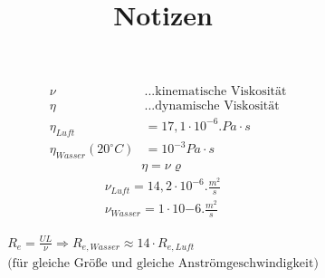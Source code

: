 \documentclass[10pt]{article}
\title{Notizen}
\begin{document}
\maketitle


\begin{align*}
&\nu  \qquad  &\text{...kinematische Viskosität} \\
&\eta           &\text{...dynamische Viskosität}\\
&\eta _{Luft} &=	17,1 \cdot 10^{-6} \si{.Pa \cdot s} \\
&\eta _{Wasser} (20^\circ C) &= 10^{-3} \si{Pa \cdot s}
\end{align*}
\begin{align*}
\eta = \nu \varrho
\end{align*}
\begin{align*}
 \nu _{Luft} = 14,2 \cdot 10^{-6} \si{. \frac{m^2}{s}} \\
\nu _{Wasser} = 1 \cdot 10{-6}  \si{. \frac{m^2}{s}}
\end{align*}

\begin{align*}
R_e = \frac{UL}{\nu} \Rightarrow R_{e,Wasser} \approx 14 \cdot R_{e, Luft}\\
\text{(für gleiche Größe und gleiche Anströmgeschwindigkeit)}
\end{align*}
\end{document}
